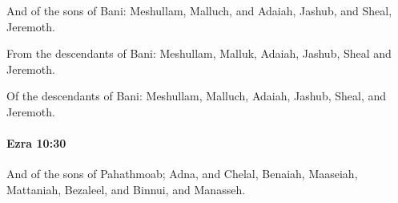 			\begin{versebox}
					\item[BHS] 
					\item[LXX] 
					\item[ASV] And of the sons of Bani: Meshullam, Malluch, and Adaiah, Jashub, and Sheal, Jeremoth.
					\item[NIV] From the descendants of Bani: Meshullam, Malluk, Adaiah, Jashub, Sheal and Jeremoth.
					\item[NRSV] Of the descendants of Bani: Meshullam, Malluch, Adaiah, Jashub, Sheal, and Jeremoth.
			\end{versebox}

		\paragraph{Ezra 10:30} %
			\label{EZRA-10-30}

			And of the sons of Pahathmoab; Adna, and Chelal, Benaiah, Maaseiah, Mattaniah, Bezaleel, and Binnui, and Manasseh.

